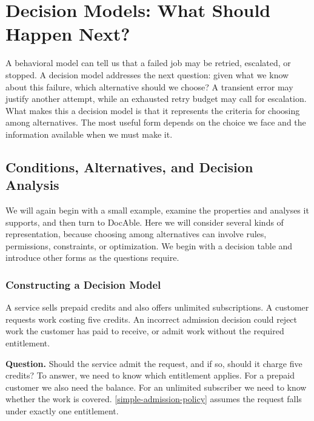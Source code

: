 


\chapter{Decision Models: What Should Happen Next?}

A behavioral model can tell us that a failed job may be retried, escalated, or stopped. A decision model addresses the next question: given what we know about this failure, which alternative should we choose? A transient error may justify another attempt, while an exhausted retry budget may call for escalation. What makes this a decision model is that it represents the criteria for choosing among alternatives. The most useful form depends on the choice we face and the information available when we must make it.

\section{Conditions, Alternatives, and Decision Analysis}\label{heading:conditions-alternatives-and-decision-analysis}

We will again begin with a small example, examine the properties and analyses it supports, and then turn to DocAble. Here we will consider several kinds of representation, because choosing among alternatives can involve rules, permissions, constraints, or optimization. We begin with a decision table and introduce other forms as the questions require.

\subsection{Constructing a Decision Model}\label{heading:constructing-a-decision-model}

A service sells prepaid credits and also offers unlimited subscriptions. A customer requests work costing five credits. An incorrect admission decision could reject work the customer has paid to receive, or admit work without the required entitlement.

\textbf{Question.} Should the service admit the request, and if so, should it charge five credits? To answer, we need to know which entitlement applies. For a prepaid customer we also need the balance. For an unlimited subscriber we need to know whether the work is covered. \autoref{simple-admission-policy} assumes the request falls under exactly one entitlement.

